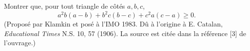 Montrer que, pour tout triangle de côtés $a, b, c$,
\[ a^2b(a - b) + b^2c(b - c) + c^2a(c - a) \geq 0. \]
(Proposé par Klamkin et posé à l'IMO 1983. Dû à l'origine à E. Catalan, \emph{Educational Times} N.S. 10, 57 (1906). La source est citée dans la référence [3] de l'ouvrage.)
